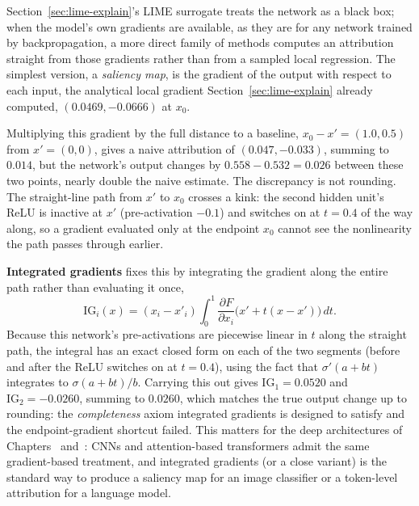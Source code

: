 \documentclass[../ai_in_finance]{subfiles}
\begin{document}
Section~\ref{sec:lime-explain}'s LIME surrogate treats the network as a black box; when the model's own gradients are available, as they are for any network trained by
 backpropagation, a more direct family of methods computes an attribution straight from those gradients rather than from a sampled local
 regression. The simplest version, a \emph{saliency map}, is the gradient of the output with respect to each input, the
 analytical local gradient Section~\ref{sec:lime-explain} already computed, $(0.0469, -0.0666)$ at $x_0$.

Multiplying this gradient by
 the full distance to a baseline, $x_0 - x' = (1.0, 0.5)$ from $x' = (0,0)$, gives a naive attribution of $(0.047, -0.033)$,
 summing to $0.014$, but the network's output changes by $0.558 - 0.532 = 0.026$ between these two points, nearly double the naive estimate. The discrepancy is not rounding. The straight-line path from $x'$ to $x_0$ crosses a kink: the second hidden unit's ReLU is inactive at $x'$ (pre-activation $-0.1$) and switches on at $t = 0.4$ of the way along, so a gradient evaluated only at the endpoint $x_0$ cannot see the nonlinearity the path passes through earlier.

\textbf{Integrated gradients} \parencite{sundararajan2017axiomatic} fixes this by integrating the gradient along the entire path rather
than evaluating it once,
\begin{equation}
\text{IG}_i(x) = (x_i - x'_i) \int_0^1 \frac{\partial F}{\partial x_i}\big(x' + t(x - x')\big)\, dt.
\label{eq:xai-ig}
\end{equation}
Because this network's pre-activations are piecewise linear in $t$ along the straight path, the integral has an exact closed form on each of the
two segments (before and after the ReLU switches on at $t=0.4$), using the fact that
$\sigma'(a+bt)$ integrates to $\sigma(a+bt)/b$.
 Carrying this out gives
 $\text{IG}_1 = 0.0520$ and $\text{IG}_2 = -0.0260$,
 summing to $0.0260$, which matches the true output change up to rounding: the \emph{completeness} axiom integrated gradients is designed to satisfy and the endpoint-gradient shortcut failed. This matters for the deep architectures of Chapters~ and~: CNNs and attention-based transformers admit the same gradient-based treatment, and integrated gradients (or a close variant) is the standard way to produce a saliency map for an image classifier or a token-level attribution for a language model.
\end{document}

